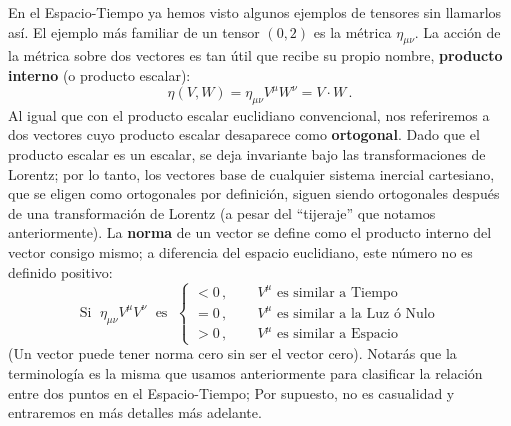 \documentclass[11pt,b5paper,openany,twoside]{book}
\newcommand{\mn}{{\mu\nu}}
\begin{document}
En el Espacio-Tiempo ya hemos visto algunos ejemplos de tensores sin llamarlos así.
El ejemplo más familiar de un tensor $(0,2)$ es la métrica $\eta_\mn$.
La acción de la métrica sobre dos vectores es tan útil que recibe su propio nombre, {\bf producto interno} (o producto escalar):
\begin{equation}
\eta(V,W) = \eta_\mn V^\mu W^\nu = V\cdot W\,.\label{1.55}
\end{equation}
Al igual que con el producto escalar euclidiano convencional, nos referiremos a dos vectores cuyo producto escalar desaparece como {\bf ortogonal}.
Dado que el producto escalar es un escalar, se deja invariante bajo las transformaciones de Lorentz; por lo tanto, los vectores base de cualquier sistema inercial cartesiano, que se eligen como ortogonales por definición, siguen siendo ortogonales después de una transformación de Lorentz (a pesar del ``tijeraje'' que notamos anteriormente).
La {\bf norma} de un vector se define como el producto interno del vector consigo mismo; a diferencia del espacio euclidiano, este número no es definido positivo:
\begin{equation*}
\text{Si }\; \eta_\mn V^\mu V^\nu\; \text{ es }\; \left\{
\begin{aligned}
<0\,, \quad & \; V^\mu \text{ es similar a Tiempo} \\
=0\,, \quad & \; V^\mu \text{ es similar a la Luz ó Nulo} \\
>0\,, \quad & \; V^\mu \text{ es similar a Espacio}
\end{aligned} \right.
\end{equation*}
(Un vector puede tener norma cero sin ser el vector cero).
Notarás que la terminología es la misma que usamos anteriormente para clasificar la relación entre dos puntos en el Espacio-Tiempo; Por supuesto, no es casualidad y entraremos en más detalles más adelante.
\end{document}
